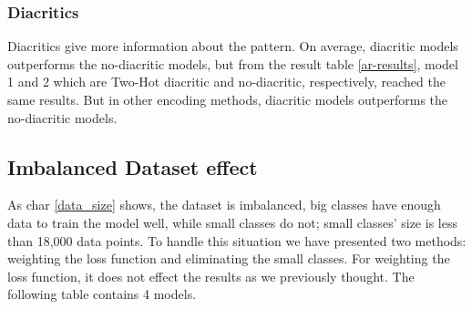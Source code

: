\subsubsection{Diacritics}
 Diacritics give more information about the pattern. On average, diacritic models
outperforms the no-diacritic models, but from the result table \ref{ar-results},
model 1 and 2 which are Two-Hot diacritic and no-diacritic, respectively, reached
the same results. But in other encoding methods, diacritic models outperforms the
no-diacritic models.







  
\subsection*{Imbalanced Dataset effect}
As char \ref{data_size} shows, the dataset is imbalanced, big classes have enough
data to train the model well, while small classes do not; small classes' size is
less than 18,000 data points. To handle this situation we have presented two
methods: weighting the loss function and eliminating the small classes. For
weighting the loss function, it does not effect the results as we previously
thought. The following table contains 4 models.

